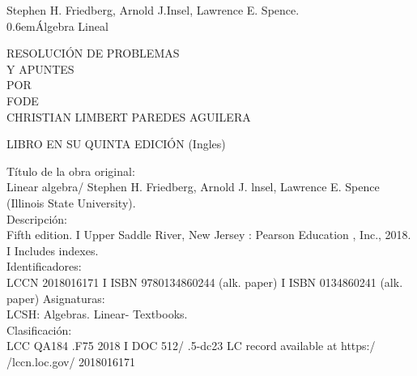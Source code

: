 \begin{titlingpage}

\newcommand\nbvspace[1][3]{\vspace*{\stretch{#1}}}
\newcommand\nbstretchyspace{\spaceskip0.5em plus 0.25em minus 0.25em}
\newcommand{\nbtitlestretch}{\spaceskip0.6em}
\pagestyle{empty}

\begin{center}
\bfseries
\nbvspace[1]

\Large Stephen H. Friedberg, Arnold J.Insel, Lawrence E. Spence.\\
\Huge
{\nbtitlestretch\Huge Álgebra Lineal}\\
\vspace{.5cm}
\large
\nbvspace[1]

RESOLUCIÓN DE PROBLEMAS\\
Y APUNTES\\

\nbvspace[1]
\small POR\\
\Large FODE\\[0.5em]
\footnotesize CHRISTIAN LIMBERT PAREDES AGUILERA\\

\nbvspace[2]

\begin{center}
\end{center}

\nbvspace[3]
\normalsize

LIBRO EN SU QUINTA EDICIÓN (Ingles)\\
\large
\nbvspace[1]

\end{center}

\break
\bfseries 

\nbvspace[1]
Título de la obra original:\\
 Linear algebra/ Stephen H. Friedberg, Arnold J. lnsel, Lawrence E. Spence (Illinois State University).\\
Descripción: \\
Fifth edition. I Upper Saddle River, New Jersey : Pearson Education , Inc., 2018. I Includes indexes.\\
Identificadores: \\
LCCN 2018016171 I ISBN 9780134860244 (alk. paper) I ISBN 0134860241 (alk. paper)
Asignaturas: \\
LCSH: Algebras. Linear- Textbooks.\\
Clasificación: \\
LCC QA184 .F75 2018 I DOC 512/ .5-dc23 LC record available at https:/ /lccn.loc.gov/ 2018016171


\end{titlingpage}
